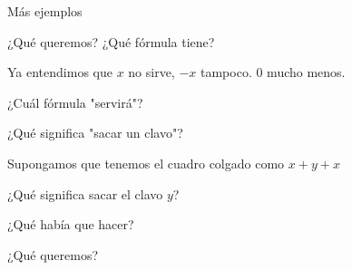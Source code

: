 \documentclass[11pt]{beamer}
\begin{document}
\begin{frame}{Más ejemplos}

\bigskip

\bigskip

\center {\textbf {  \huge{[Pizarrón]}}}








\end{frame}


\begin{frame}{¿Qué queremos? ¿Qué fórmula tiene?}

Ya entendimos que {\color{red}$x$} no sirve, {\color{red}$-x$} tampoco. {\color{red}$0$} mucho menos.


¿Cuál fórmula "servirá"?

\end{frame}


\begin{frame}{¿Qué significa "sacar un clavo"?}

Supongamos que tenemos el cuadro colgado como {\color{red}$x + y + x$}

¿Qué significa sacar el clavo $y$?

\bigskip



\end{frame}






\begin{frame}{¿Qué había que hacer?}

¿Qué queremos?
\bigskip



\end{frame}
\end{document}
